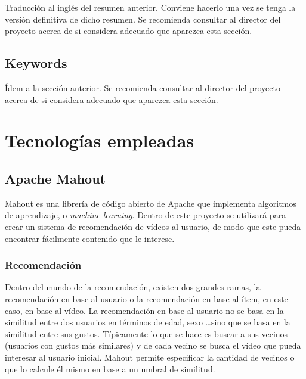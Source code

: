 \documentclass[11pt]{book}
\begin{document}
\noindent Traducción al inglés del resumen anterior. Conviene hacerlo una vez se tenga la versión definitiva de dicho resumen. Se recomienda consultar al director del proyecto acerca de si considera adecuado que aparezca esta sección.

\newpage
\thispagestyle{empty}
\mbox{}

\newpage
\thispagestyle{empty}

\section*{Keywords}

\noindent Ídem a la sección anterior. Se recomienda consultar al director del proyecto acerca de si considera adecuado que aparezca esta sección.

\newpage
\thispagestyle{empty}
\mbox{}

\newpage
\thispagestyle{empty}

\tableofcontents

\setcounter{tocdepth}{3}

\listoffigures

\chapter{Tecnologías empleadas}
\section{Apache Mahout}
Mahout es una librería de código abierto de Apache que implementa algoritmos de aprendizaje, o \textit{machine learning}. Dentro de este proyecto se utilizará para crear un sistema de recomendación de vídeos al usuario, de modo que este pueda encontrar fácilmente contenido que le interese.
\subsection{Recomendación}
Dentro del mundo de la recomendación, existen dos grandes ramas, la recomendación en base al usuario o la recomendación en base al ítem, en este caso, en base al vídeo.
La recomendación en base al usuario no se basa en la similitud entre dos usuarios en términos de edad, sexo \dots sino que se basa en la similitud entre sus gustos. Típicamente lo que se hace es buscar a sus vecinos (usuarios con gustos más similares) y de cada vecino se busca el vídeo que pueda interesar al usuario inicial. Mahout permite especificar la cantidad de vecinos o que lo calcule él mismo en base a un umbral de similitud.
\end{document}
